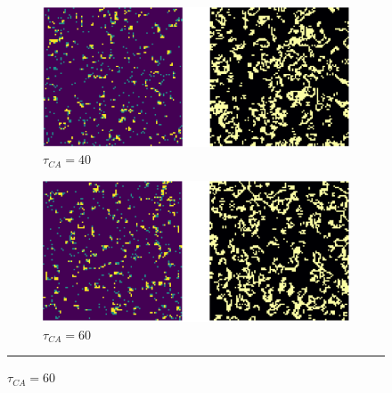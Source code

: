 \documentclass{mcmthesis}
\begin{document}
\begin{figure}[H]
  \begin{subfigure}[b]{0.45\textwidth}
    \includegraphics[width=\textwidth]{figures/NormalSimulation_3.png}
    \caption{$\tau_{CA} = 40$}
    \label{fig:sub3}
  \end{subfigure}
  \hfill
  \begin{subfigure}[b]{0.45\textwidth}
    \includegraphics[width=\textwidth]{figures/NormalSimulation_4.png}
    \caption{$\tau_{CA} = 60$}
    \label{fig:sub4}
  \end{subfigure}

  \vspace*{5pt} %
  \hrule %
  \vspace*{5pt} %
  

\end{figure}
\end{document}
